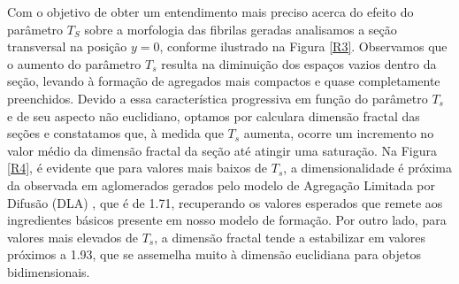 \documentclass[11pt,a4paper]{article} %
\begin{document}
     
        Com o objetivo de obter um entendimento mais preciso acerca do efeito do parâmetro $T_{S}$ sobre a morfologia das  
        fibrilas geradas analisamos a seção transversal na posição \(y=0\), conforme ilustrado na Figura \ref{R3}. Observamos  
        que o aumento do parâmetro \(T_{s}\) resulta na diminuição dos espaços vazios dentro da seção, levando à formação de  
        agregados mais compactos e quase completamente preenchidos. Devido a essa característica progressiva em função do  
        parâmetro \(T_{s}\) e de seu aspecto não euclidiano, optamos por calculara dimensão fractal das seções e constatamos que,  
        à medida que \(T_{s}\) aumenta, ocorre um incremento no valor médio da dimensão fractal da seção até atingir uma saturação.  
        Na Figura \ref{R4}, é evidente que para valores mais baixos de \(T_{s}\), a dimensionalidade é próxima da observada em aglomerados  
        gerados pelo modelo de Agregação Limitada por Difusão (DLA) \cite{Witten1983}, que é de 1.71, recuperando os valores esperados  
        que remete aos ingredientes básicos presente em nosso modelo de formação. Por outro lado, para valores mais elevados  
        de \(T_{s}\), a dimensão fractal tende a estabilizar em valores próximos a 1.93, que se assemelha muito à dimensão  
        euclidiana para objetos bidimensionais.  
\end{document}
